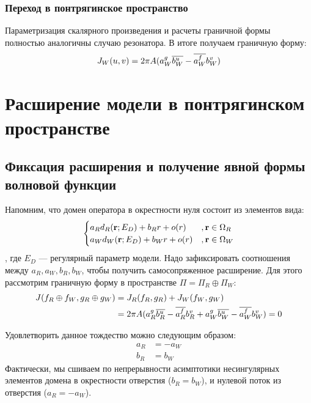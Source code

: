 \subsubsection{Переход в понтрягинское пространство}
Параметризация скалярного произведения и расчеты граничной формы полностью аналогичны случаю резонатора. В итоге получаем граничную форму:
\begin{align*}
J_W(u, v) = 2 \pi A (a_W^g \overline{b_W^u} - \overline{a_W^f} b_W^v)
\end{align*}

\section{Расширение модели в понтрягинском пространстве}
\subsection{Фиксация расширения и получение явной формы волновой функции}

Напомним, что домен оператора в окрестности нуля состоит из элементов вида:
\[
\begin{cases}
a_R d_R(\vb{r}; E_D) + b_R r + o(r)  &, \vb{r} \in \Omega_R \\
a_W d_W(\vb{r}; E_D) + b_W r + o(r)  &, \vb{r} \in \Omega_W \\
\end{cases}
\], где $E_D$ — регулярный параметр модели. Надо зафиксировать соотношения между $a_R, a_W, b_R, b_W$, чтобы получить самосопряженное расширение. Для этого рассмотрим граничную форму в пространстве $\Pi = \Pi_R \oplus \Pi_W$:
\begin{align*}
J(f_R \oplus f_W, g_R \oplus g_W)
&= J_R(f_R, g_R) + J_W(f_W, g_W) \\
&= 2 \pi A (a_R^g \overline{b_R^u} - \overline{a_R^f} b_R^v  + a_W^g \overline{b_W^u} - \overline{a_W^f} b_W^v)  = 0
\end{align*}

Удовлетворить данное тождество можно следующим образом:
\begin{align*}
a_R &= -a_W \\
b_R &= b_W
\end{align*}
Фактически, мы сшиваем по непрерывности асимптотики несингулярных элементов домена в окрестности отверстия ($b_R = b_W$), и нулевой поток из отверстия ($a_R = -a_W$).

